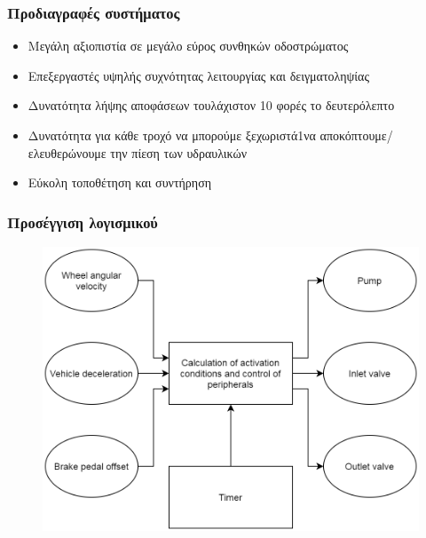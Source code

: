 \documentclass[fleqn]{beamer}
\begin{document}
\begin{frame}
  \frametitle{Προδιαγραφές συστήματος}
  \begin{itemize}
      \item Μεγάλη αξιοπιστία σε μεγάλο εύρος συνθηκών οδοστρώματος
      \item Επεξεργαστές υψηλής συχνότητας λειτουργίας και δειγματοληψίας
      \item Δυνατότητα λήψης αποφάσεων τουλάχιστον 10 φορές το δευτερόλεπτο
      \item Δυνατότητα για κάθε τροχό να μπορούμε ξεχωριστά1να αποκόπτουμε/ελευθερώνουμε την πίεση των υδραυλικών
      \item Εύκολη τοποθέτηση και συντήρηση
  \end{itemize}
\end{frame}

\begin{frame}
\frametitle{Προσέγγιση λογισμικού}
\begin{figure}[H]
    \begin{center}
    \includegraphics[scale=0.20]{images/software-architecture-preview.png}
    \end{center}
\end{figure}
\end{frame}
\end{document}
